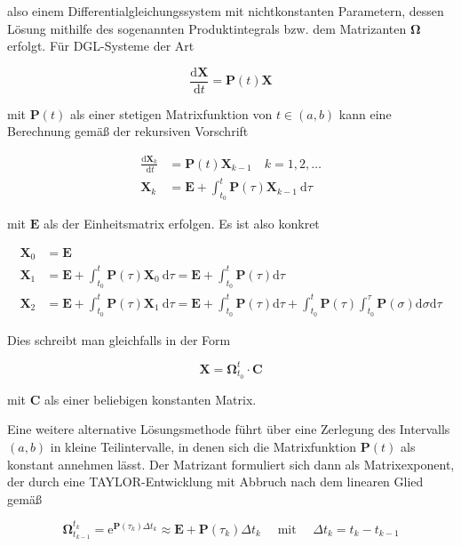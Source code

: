 also einem Differentialgleichungssystem mit nichtkonstanten Parametern, dessen Lösung mithilfe des sogenannten Produktintegrals bzw. dem Matrizanten $\boldsymbol{\Omega}$ erfolgt. Für DGL-Systeme der Art


\begin{equation}
	\frac{\mathrm{d} \mathbf{X}}{\mathrm{d} t}=\mathbf{P}(t) \mathbf{X} 
\end{equation}


mit $\mathbf{P}(t)$ als einer stetigen Matrixfunktion von $t \in(a, b)$ kann eine Berechnung gemäß der rekursiven Vorschrift


\begin{align}
	\frac{\mathrm{d} \mathbf{X}_{k}}{\mathrm{~d} t} & =\mathbf{P}(t) \mathbf{X}_{k-1} \quad k=1,2, \ldots  \\
	\mathbf{X}_{k} & =\mathbf{E}+\int_{t_{0}}^{t} \mathbf{P}(\tau) \mathbf{X}_{k-1} \mathrm{~d} \tau 
\end{align}


mit $\mathbf{E}$ als der Einheitsmatrix erfolgen. Es ist also konkret


\begin{align}
	\mathbf{X}_{0} & =\mathbf{E}  \\
	\mathbf{X}_{1} & =\mathbf{E}+\int_{t_{0}}^{t} \mathbf{P}(\tau) \mathbf{X}_{0} \mathrm{~d} \tau=\mathbf{E}+\int_{t_{0}}^{t} \mathbf{P}(\tau) \mathrm{d} \tau  \\
	\mathbf{X}_{2} & =\mathbf{E}+\int_{t_{0}}^{t} \mathbf{P}(\tau) \mathbf{X}_{1} \mathrm{~d} \tau=\mathbf{E}+\int_{t_{0}}^{t} \mathbf{P}(\tau) \mathrm{d} \tau+\int_{t_{0}}^{t} \mathbf{P}(\tau) \int_{t_{0}}^{\tau} \mathbf{P}(\sigma) \mathrm{d} \sigma \mathrm{d} \tau 
\end{align}


Dies schreibt man gleichfalls in der Form


\begin{equation}
	\mathbf{X}=\boldsymbol{\Omega}_{t_{0}}^{t} \cdot \mathbf{C} 
\end{equation}


mit $\mathbf{C}$ als einer beliebigen konstanten Matrix.

Eine weitere alternative Lösungsmethode führt über eine Zerlegung des Intervalls $(a, b)$ in kleine Teilintervalle, in denen sich die Matrixfunktion $\mathbf{P}(t)$ als konstant annehmen lässt. Der Matrizant formuliert sich dann als Matrixexponent, der durch eine TAYLOR-Entwicklung mit Abbruch nach dem linearen Glied gemäß


\begin{equation}
	\boldsymbol{\Omega}_{t_{k-1}}^{t_{k}}=\mathrm{e}^{\mathbf{P}\left(\tau_{k}\right) \Delta t_{k}} \approx \mathbf{E}+\mathbf{P}\left(\tau_{k}\right) \Delta t_{k} \quad \text { mit } \quad \Delta t_{k}=t_{k}-t_{k-1} 
\end{equation}



